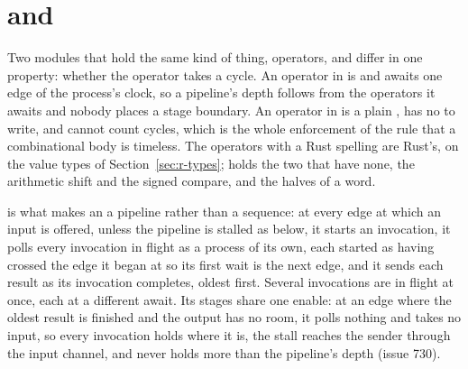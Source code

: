 \section{ and }
\label{sec:r-operators}

Two modules that hold the same kind of thing, operators, and differ in
one property: whether the operator takes a cycle. An operator in
 is  and awaits one edge of the process's
clock, so a pipeline's depth follows from the operators it awaits and
nobody places a stage boundary. An operator in  is a plain
, has no  to write, and cannot count cycles, which
is the whole enforcement of the rule that a combinational body is
timeless. The operators with a Rust spelling are Rust's, on the value
types of Section~\ref{sec:r-types};  holds the two that
have none, the arithmetic shift and the signed compare, and the
halves of a word.

 is what makes an  a pipeline rather
than a sequence: at every edge at which an input is offered, unless
the pipeline is stalled as below, it starts an invocation, it polls
every invocation in flight as a process of its own, each started as
having crossed the edge it began at so its first wait is the next
edge, and it sends each result as its invocation completes, oldest
first. Several invocations are in flight at once, each at a different
await. Its stages share one enable: at an edge where the oldest result
is finished and the output has no room, it polls nothing and takes
no input, so every invocation holds where it is, the stall reaches
the sender through the input channel, and  never holds
more than the pipeline's depth (issue 730).



